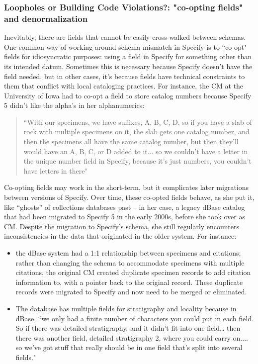 \subsubsection{Loopholes or Building Code Violations?: "co-opting fields" and denormalization }

Inevitably, there are fields that cannot be easily cross-walked between schemas. One common way of working around schema mismatch in Specify is to “co-opt" fields for idiosyncratic purposes: using a field in Specify for something other than its intended datum. Sometimes this is necessary because Specify doesn’t have the field needed, but in other cases, it’s because fields have technical constraints to them that conflict with local cataloging practices. For instance, the CM at the University of Iowa had to co-opt a field to store catalog numbers because Specify 5 didn’t like the alpha’s in her alphanumerics:
\begin{quote}
“With our specimens, we have suffixes, A, B, C, D, so if you have a slab of rock with multiple specimens on it, the slab gets one catalog number, and then the specimens all have the same catalog number, but then they'll would have an A, B, C, or D added to it... so we couldn't have a letter in the unique number field in Specify, because it's just numbers, you couldn't have letters in there"
\end{quote}
Co-opting fields may work in the short-term, but it complicates later migrations between versions of Specify. Over time, these co-opted fields behave, as she put it, like “ghosts” of collections databases past -- in her case, a legacy dBase catalog that had been migrated to Specify 5 in the early 2000s, before she took over as CM. Despite the migration to Specify's schema, she still regularly encounters inconsistencies in the data that originated in the older system. For instance: 
\begin{itemize}
\item the dBase system had a 1:1 relationship between specimens and citations; rather than changing the schema to accommodate specimens with multiple citations, the original CM created duplicate specimen records to add citation information to, with a pointer back to the original record. These duplicate records were migrated to Specify and now need to be merged or eliminated.
\item The database has multiple fields for stratigraphy and locality because in dBase, “we only had a finite number of characters you could put in each field. So if there was detailed stratigraphy, and it didn't fit into one field… then there was another field, detailed stratigraphy 2, where you could carry on.... so we've got stuff that really should be in one field that's split into several fields."  
\end{itemize}
